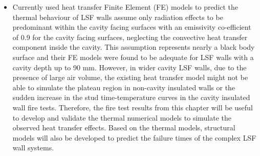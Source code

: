 \begin{itemize}
	\item Currently used heat transfer Finite Element (FE) models to predict the thermal behaviour of LSF walls assume only radiation effects to be predominant within the cavity facing surfaces with an emissivity co-efficient of 0.9 for the cavity facing surfaces, neglecting the convective heat transfer component inside the cavity. This assumption represents nearly a black body surface and their FE models were found to be adequate for LSF walls with a cavity depth up to 90 mm. However, in wider cavity LSF walls, due to the presence of large air volume, the existing heat transfer model might not be able to simulate the plateau region in non-cavity insulated walls or the sudden increase in the stud time-temperature curves in the cavity insulated wall fire tests. Therefore, the fire test results from this chapter will be useful to develop and validate the thermal numerical models to simulate the observed heat transfer effects. Based on the thermal models, structural models will also be developed to predict the failure times of the complex LSF wall systems. 
\end{itemize}








